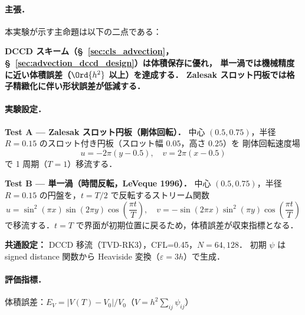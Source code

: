 %

\paragraph{主張．}

本実験が示す主命題は以下の二点である：

\begin{center}
\textbf{%
  DCCD スキーム（§~\ref{sec:cls_advection}，§~\ref{sec:advection_dccd_design}）は体積保存に優れ，%
  単一渦では機械精度に近い体積誤差（$\Ord{h^2}$ 以上）を達成する．%
  Zalesak スロット円板では格子精緻化に伴い形状誤差が低減する．}
\end{center}

\paragraph{実験設定．}

\textbf{Test A — Zalesak スロット円板（剛体回転）．}
中心 $(0.5,0.75)$，半径 $R=0.15$ のスロット付き円板（スロット幅 $0.05$，高さ $0.25$）を
剛体回転速度場
\begin{equation}
  u = -2\pi(y - 0.5), \quad v = 2\pi(x - 0.5)
  \label{eq:solid_body_vel}
\end{equation}
で 1 周期（$T=1$）移流する．

\textbf{Test B — 単一渦（時間反転，LeVeque 1996）．}
中心 $(0.5,0.75)$，半径 $R=0.15$ の円盤を，$t = T/2$ で反転するストリーム関数
\begin{equation}
  u = \sin^2(\pi x)\sin(2\pi y)\cos\!\left(\frac{\pi t}{T}\right), \quad
  v = -\sin(2\pi x)\sin^2(\pi y)\cos\!\left(\frac{\pi t}{T}\right)
  \label{eq:single_vortex_vel}
\end{equation}
で移流する．$t=T$ で界面が初期位置に戻るため，体積誤差が収束指標となる．

\textbf{共通設定：} DCCD 移流（TVD-RK3），CFL=0.45，$N=64,128$．
初期 $\psi$ は signed distance 関数から Heaviside 変換（$\varepsilon = 3h$）で生成．

\paragraph{評価指標．}

体積誤差：$E_V = |V(T) - V_0| / V_0$（$V = h^2 \sum_{ij} \psi_{ij}$）

